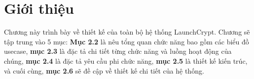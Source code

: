 \setlength{\parindent}{1cm}

\section{Giới thiệu}

\hspace{1cm}Chương này trình bày về thiết kế của toàn bộ hệ thống LaunchCrypt.
Chương sẽ tập trung vào 5 mục: \textbf{Mục 2.2} là nêu tổng quan chức năng bao
gồm các biểu đồ usecase, \textbf{mục 2.3} là đặc tả chi tiết từng chức năng và
luồng hoạt động của chúng, \textbf{mục 2.4} là đặc tả yêu cầu phi chức năng,
\textbf{mục 2.5} là thiết kế kiến trúc, và cuối cùng, \textbf{mục 2.6} sẽ đề
cập về thiết kế chi tiết của hệ thống.